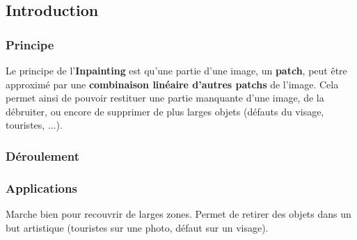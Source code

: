 \documentclass[a4paper]{memoir}
\begin{document}
\subsection{Introduction}
\subsubsection{Principe}
Le principe de l'\textbf{Inpainting} est qu'une partie d'une image, un \textbf{patch}, peut être approximé par une \textbf{combinaison linéaire d'autres patchs} de l'image. Cela permet ainsi de pouvoir restituer une partie manquante d'une image, de la débruiter, ou encore de supprimer de plus larges objets (défauts du visage, touristes, $\ldots$).


\subsubsection{Déroulement}


\subsubsection{Applications}
Marche bien pour recouvrir de larges zones. Permet de retirer des objets dans un but artistique (touristes sur une photo, défaut sur un visage).
\end{document}
